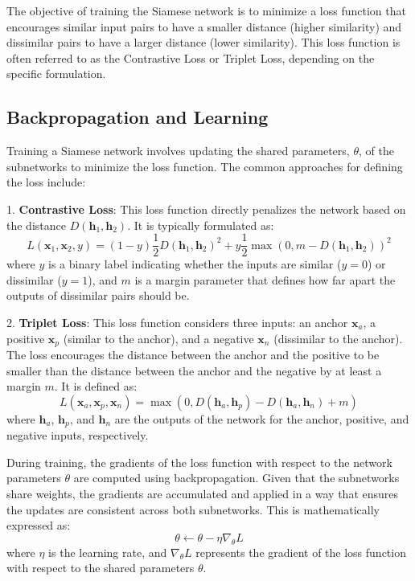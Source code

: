\documentclass[12pt]{article}
\begin{document}
The objective of training the Siamese network is to minimize a loss function that encourages similar input pairs to have a smaller distance (higher similarity) and dissimilar pairs to have a larger distance (lower similarity). This loss function is often referred to as the Contrastive Loss or Triplet Loss, depending on the specific formulation.

\subsection{Backpropagation and Learning}
Training a Siamese network involves updating the shared parameters, \(\theta\), of the subnetworks to minimize the loss function. The common approaches for defining the loss include:

1. \textbf{Contrastive Loss}: This loss function directly penalizes the network based on the distance \(D(\mathbf{h}_1, \mathbf{h}_2)\). It is typically formulated as:
\[
L(\mathbf{x}_1, \mathbf{x}_2, y) = (1 - y) \frac{1}{2} D(\mathbf{h}_1, \mathbf{h}_2)^2 + y \frac{1}{2} \max(0, m - D(\mathbf{h}_1, \mathbf{h}_2))^2
\]
where \(y\) is a binary label indicating whether the inputs are similar (\(y = 0\)) or dissimilar (\(y = 1\)), and \(m\) is a margin parameter that defines how far apart the outputs of dissimilar pairs should be.

2. \textbf{Triplet Loss}: This loss function considers three inputs: an anchor \(\mathbf{x}_a\), a positive \(\mathbf{x}_p\) (similar to the anchor), and a negative \(\mathbf{x}_n\) (dissimilar to the anchor). The loss encourages the distance between the anchor and the positive to be smaller than the distance between the anchor and the negative by at least a margin \(m\). It is defined as:
\[
L(\mathbf{x}_a, \mathbf{x}_p, \mathbf{x}_n) = \max(0, D(\mathbf{h}_a, \mathbf{h}_p) - D(\mathbf{h}_a, \mathbf{h}_n) + m)
\]
where \(\mathbf{h}_a\), \(\mathbf{h}_p\), and \(\mathbf{h}_n\) are the outputs of the network for the anchor, positive, and negative inputs, respectively.

During training, the gradients of the loss function with respect to the network parameters \(\theta\) are computed using backpropagation. Given that the subnetworks share weights, the gradients are accumulated and applied in a way that ensures the updates are consistent across both subnetworks. This is mathematically expressed as:
\[
\theta \leftarrow \theta - \eta \nabla_{\theta} L
\]
where \(\eta\) is the learning rate, and \(\nabla_{\theta} L\) represents the gradient of the loss function with respect to the shared parameters \(\theta\).
\end{document}
